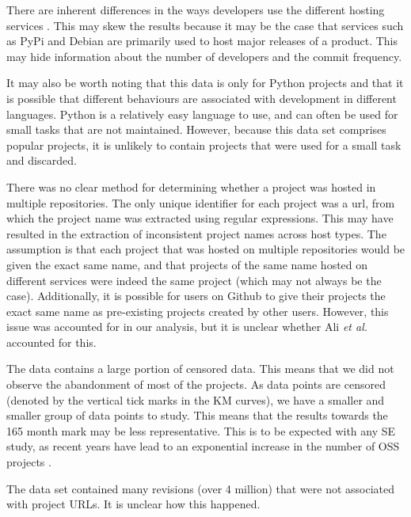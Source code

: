 \documentclass[acmconf]{acmart}
\begin{document}
There are inherent differences in the ways developers use the different hosting services . This may skew the results because it may be the case that services such as PyPi and Debian are primarily used to host major releases of a product. This may hide information about the number of developers and the commit frequency.

It may also be worth noting that this data is only for Python projects and that it is possible that different behaviours are associated with development in different languages.
Python is a relatively easy language to use, and can often be used for small tasks that are not maintained.
However, because this data set comprises popular projects, it is unlikely to contain projects that were used for a small task and discarded.

There was no clear method for determining whether a project was hosted in multiple repositories.
The only unique identifier for each project was a url, from which the project name was extracted using regular expressions.
This may have resulted in the extraction of inconsistent project names across host types.
The assumption is that each project that was hosted on multiple repositories would be given the exact same name, and that projects of the same name hosted on different services were indeed the same project (which may not always be the case).
Additionally, it is possible for users on Github to give their projects the exact same name as pre-existing projects created by other users.
However, this issue was accounted for in our analysis, but it is unclear whether Ali \emph{et al.} accounted for this.

The data contains a large portion of censored data.
This means that we did not observe the abandonment of most of the projects.
As data points are censored (denoted by the vertical tick marks in the KM curves), we have a smaller and smaller group of data points to study.
This means that the results towards the 165 month mark may be less representative.
This is to be expected with any SE study, as recent years have lead to an exponential increase in the number of OSS projects .


The data set contained many revisions (over 4 million) that were not associated with project URLs.
It is unclear how this happened.
\end{document}
